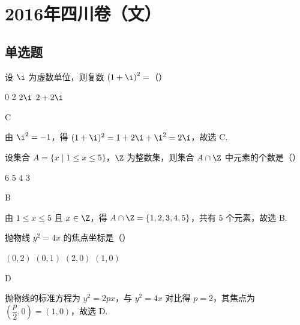 
\chapter{2016年四川卷（文）}

\section{单选题}

\begin{problem}
设 \(\i\) 为虚数单位，则复数 \(\left( 1+\i \right)^2=\)（\quad）

\choices
    {\(0\)}
    {\(2\)}
    {\(2\i\)}
    {\(2+2\i\)}
\end{problem}

\begin{answer}
C
\end{answer}

\begin{solution}
由 \(\i^2=-1\)，得 \((1+\i)^2=1+2\i+\i^2=2\i\)，故选 C.
\end{solution}

\begin{problem}
设集合 \(A=\{x\mid 1\le x\le 5\}\)，\(\Z\) 为整数集，则集合 \(A\cap \Z\) 中元素的个数是（\quad）

\choices
    {\(6\)}
    {\(5\)}
    {\(4\)}
    {\(3\)}
\end{problem}

\begin{answer}
B
\end{answer}

\begin{solution}
由 \(1\leqslant x\leqslant5\) 且 \(x\in\Z\)，得 \(A\cap\Z=\{1,2,3,4,5\}\)，共有 \(5\) 个元素，故选 B.
\end{solution}

\begin{problem}
抛物线 \(y^2=4x\) 的焦点坐标是（\quad）

\choices
    {\((0,2)\)}
    {\((0,1)\)}
    {\((2,0)\)}
    {\((1,0)\)}
\end{problem}

\begin{answer}
D
\end{answer}

\begin{solution}
抛物线的标准方程为 \(y^2=2px\)，与 \(y^2=4x\) 对比得 \(p=2\)，其焦点为 \(\left(\dfrac p2,0\right)=(1,0)\)，故选 D.
\end{solution}

